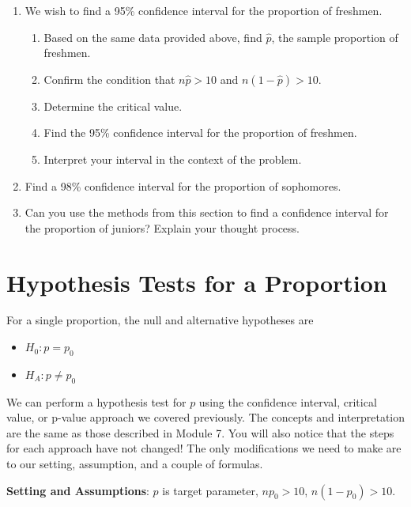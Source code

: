 \documentclass[
]{book}
\providecommand{\tightlist}{%
  \setlength{\itemsep}{0pt}\setlength{\parskip}{0pt}}
\begin{document}
\begin{enumerate}
\def\labelenumi{\arabic{enumi}.}
\tightlist
\item
  We wish to find a 95\% confidence interval for the proportion of freshmen.

  \begin{enumerate}
  \def\labelenumii{\alph{enumii}.}
  \tightlist
  \item
    Based on the same data provided above, find \(\hat{p}\), the sample proportion of freshmen.
  \item
    Confirm the condition that \(n\hat{p} > 10\) and \(n(1-\hat{p}) > 10\).
  \item
    Determine the critical value.
  \item
    Find the 95\% confidence interval for the proportion of freshmen.
  \item
    Interpret your interval in the context of the problem.
  \end{enumerate}
\item
  Find a 98\% confidence interval for the proportion of sophomores.
\item
  Can you use the methods from this section to find a confidence interval for the proportion of juniors? Explain your thought process.
\end{enumerate}

\section{Hypothesis Tests for a Proportion}\label{hypothesis-tests-for-a-proportion}

For a single proportion, the null and alternative hypotheses are

\begin{itemize}
\tightlist
\item
  \(H_0: p = p_0\)
\item
  \(H_A: p \ne p_0\)
\end{itemize}

We can perform a hypothesis test for \(p\) using the confidence interval, critical value, or p-value approach we covered previously. The concepts and interpretation are the same as those described in Module 7. You will also notice that the steps for each approach have not changed! The only modifications we need to make are to our setting, assumption, and a couple of formulas.

\textbf{Setting and Assumptions}: \(p\) is target parameter, \(np_0 > 10\), \(n(1-p_0)>10\).
\end{document}
